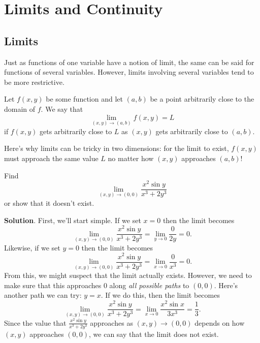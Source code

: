 \documentclass[10pt,]{book}
\theoremstyle{ptxplainnotitle}
\theoremstyle{ptxplaintitle}
\theoremstyle{ptxplainnotitle}
\theoremstyle{ptxplaintitle}
\theoremstyle{ptxplainnotitle}
\theoremstyle{ptxplaintitle}
\theoremstyle{ptxdefinitionnotitle}
\theoremstyle{ptxdefinitiontitle}
\theoremstyle{ptxdefinitionnotitle}
\theoremstyle{ptxdefinitiontitle}
\theoremstyle{ptxdefinitionnotitle}
\theoremstyle{ptxdefinitiontitle}
\theoremstyle{ptxdefinitionnotitle}
\theoremstyle{ptxdefinitiontitle}
\theoremstyle{ptxdefinitionnotitle}
\theoremstyle{ptxdefinitiontitle}
\numberwithin{equation}{section}
\begin{document}
\section[{Limits and Continuity}]{Limits and Continuity}\label{section-limits-and-continuity}
\typeout{************************************************}
\typeout{************************************************}
\subsection[{Limits}]{Limits}\label{subsection-limits}
\hypertarget{p-997}{}%
Just as functions of one variable have a notion of limit, the same can be said for functions of several variables. However, limits involving several variables tend to be more restrictive.%
\begin{definition}\label{definition-limit-of-a-function-of-two-variables}
\hypertarget{p-998}{}%
Let \(f(x,y)\) be some function and let \((a,b)\) be a point arbitrarily close to the domain of \(f\). We say that%
\begin{equation*}
\lim_{(x,y)\to(a,b)}f(x,y) = L
\end{equation*}
if \(f(x,y)\) gets arbitrarily close to \(L\) as \((x,y)\) gets arbitrarily close to \((a,b)\).%
\end{definition}
\hypertarget{p-999}{}%
Here's why limits can be tricky in two dimensions: for the limit to exist, \(f(x,y)\) must approach the same value \(L\) no matter how \((x,y)\) approaches \((a,b)\)!%
\begin{example}\label{example-210}
\hypertarget{p-1000}{}%
Find%
\begin{equation*}
\lim_{(x,y)\to(0,0)}\frac{x^{2}\sin y}{x^{3}+2y^{3}}
\end{equation*}
or show that it doesn't exist.%
\par\smallskip%
\noindent\textbf{Solution}.\hypertarget{solution-152}{}\quad%
\hypertarget{p-1001}{}%
First, we'll start simple. If we set \(x = 0\) then the limit becomes%
\begin{equation*}
\lim_{(x,y)\to(0,0)}\frac{x^{2}\sin y}{x^{3}+2y^{3}} = \lim_{y\to0}\frac{0}{2y} = 0.
\end{equation*}
Likewise, if we set \(y=0\) then the limit becomes%
\begin{equation*}
\lim_{(x,y)\to(0,0)}\frac{x^{2}\sin y}{x^{3}+2y^{3}} = \lim_{x\to0}\frac{0}{x^{3}} = 0.
\end{equation*}
From this, we might suspect that the limit actually exists. However, we need to make sure that this approaches \(0\) along \emph{all possible paths} to \((0,0)\). Here's another path we can try: \(y = x\). If we do this, then the limit becomes%
\begin{equation*}
\lim_{(x,y)\to(0,0)}\frac{x^{2}\sin y}{x^{3}+2y^{3}} = \lim_{x\to0}\frac{x^{2}\sin x}{3x^{3}} = \frac{1}{3}.
\end{equation*}
Since the value that \(\frac{x^{2}\sin y}{x^{3}+2y^{3}}\) approaches as \((x,y)\to(0,0)\) depends on how \((x,y)\) approaches \((0,0)\), we can say that the limit does not exist.%
\end{example}
\end{document}
